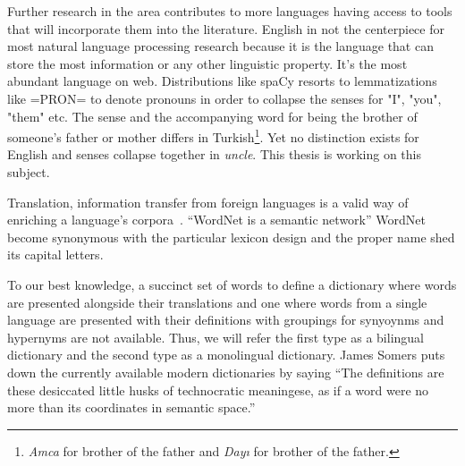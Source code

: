 Further research in the area contributes to more languages having access to tools that will incorporate them into the literature.
English in not the centerpiece for most natural language processing research because it is the language that can store the most information or any other linguistic property.
It's the most abundant language on web.
Distributions like spaCy resorts to lemmatizations like =PRON= to denote pronouns in order to collapse the senses for "I", "you", "them" etc\@.
The sense and the accompanying word for being the brother of someone's father or mother differs in Turkish\footnote{\emph{Amca} for brother of the father and \emph{Dayı} for brother of the father.}.
Yet no distinction exists for English and senses collapse together in \emph{uncle}.
This thesis is working on this subject.

Translation, information transfer from foreign languages is a valid way of enriching a language's corpora~\cite{ibrahim_usta_turkce_2006}.
\enquote{WordNet is a semantic network}\cite{fellbaum_wordnet_1998}
WordNet become synonymous with the particular lexicon design and the proper name shed its capital letters.

To our best knowledge, a succinct set of words to define a dictionary where words are presented alongside their translations and one where words from a single language are presented with their definitions with groupings for synyoynms and hypernyms are not available.
Thus, we will refer the first type as a bilingual dictionary and the second type as a monolingual dictionary.
James Somers puts down the currently available modern dictionaries by saying \enquote{The definitions are these desiccated little husks of technocratic meaningese, as if a word were no more than its coordinates in semantic space.}\cite{noauthor_youre_nodate}

